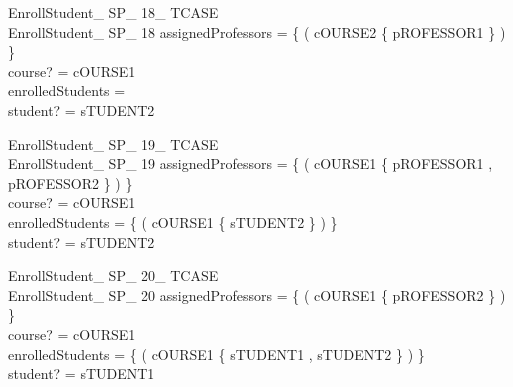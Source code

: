 \documentclass{article}
\begin{document}
\begin{schema}{EnrollStudent\_ SP\_ 18\_ TCASE}\\
 EnrollStudent\_ SP\_ 18 
\where
 assignedProfessors = \{ ( cOURSE2 \mapsto \{ pROFESSOR1 \} ) \} \\
 course? = cOURSE1 \\
 enrolledStudents =~\emptyset \\
 student? = sTUDENT2
\end{schema}


\begin{schema}{EnrollStudent\_ SP\_ 19\_ TCASE}\\
 EnrollStudent\_ SP\_ 19 
\where
 assignedProfessors = \{ ( cOURSE1 \mapsto \{ pROFESSOR1 , pROFESSOR2 \} ) \} \\
 course? = cOURSE1 \\
 enrolledStudents = \{ ( cOURSE1 \mapsto \{ sTUDENT2 \} ) \} \\
 student? = sTUDENT2
\end{schema}


\begin{schema}{EnrollStudent\_ SP\_ 20\_ TCASE}\\
 EnrollStudent\_ SP\_ 20 
\where
 assignedProfessors = \{ ( cOURSE1 \mapsto \{ pROFESSOR2 \} ) \} \\
 course? = cOURSE1 \\
 enrolledStudents = \{ ( cOURSE1 \mapsto \{ sTUDENT1 , sTUDENT2 \} ) \} \\
 student? = sTUDENT1
\end{schema}
\end{document}

